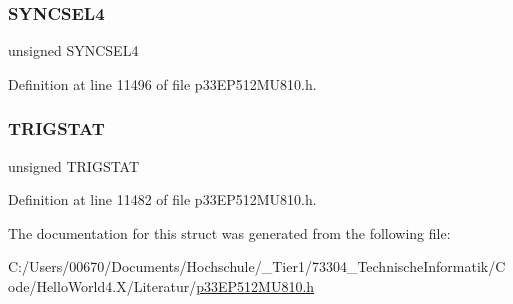 \subsubsection{\texorpdfstring{S\+Y\+N\+C\+S\+E\+L4}{SYNCSEL4}}
{\footnotesize\ttfamily unsigned S\+Y\+N\+C\+S\+E\+L4}



Definition at line 11496 of file p33\+E\+P512\+M\+U810.\+h.

\mbox{\label{structtag_o_c6_c_o_n2_b_i_t_s_ab379549de54ac93ad4aa73686c34cb7c}} 
\subsubsection{\texorpdfstring{T\+R\+I\+G\+S\+T\+AT}{TRIGSTAT}}
{\footnotesize\ttfamily unsigned T\+R\+I\+G\+S\+T\+AT}



Definition at line 11482 of file p33\+E\+P512\+M\+U810.\+h.



The documentation for this struct was generated from the following file\+:\begin{DoxyCompactItemize}
\item 
C\+:/\+Users/00670/\+Documents/\+Hochschule/\+\_\+\+Tier1/73304\+\_\+\+Technische\+Informatik/\+Code/\+Hello\+World4.\+X/\+Literatur/\hyperlink{p33_e_p512_m_u810_8h}{p33\+E\+P512\+M\+U810.\+h}\end{DoxyCompactItemize}
